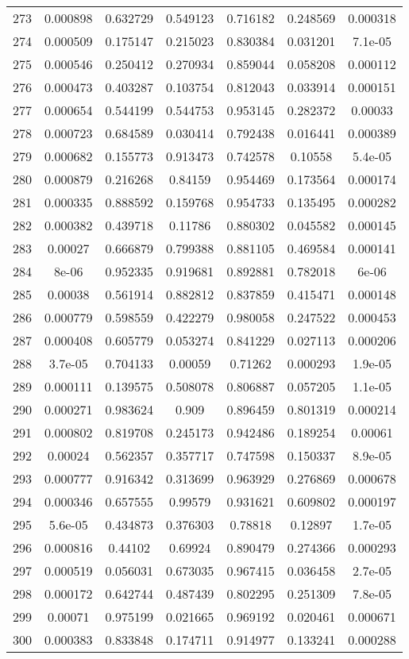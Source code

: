 \begin{table}
\begin{tabular}{c|c|c|c|c|c|c}
273 & 0.000898 & 0.632729 & 0.549123 & 0.716182 & 0.248569 & 0.000318\\
274 & 0.000509 & 0.175147 & 0.215023 & 0.830384 & 0.031201 & 7.1e-05\\
275 & 0.000546 & 0.250412 & 0.270934 & 0.859044 & 0.058208 & 0.000112\\
276 & 0.000473 & 0.403287 & 0.103754 & 0.812043 & 0.033914 & 0.000151\\
277 & 0.000654 & 0.544199 & 0.544753 & 0.953145 & 0.282372 & 0.00033\\
278 & 0.000723 & 0.684589 & 0.030414 & 0.792438 & 0.016441 & 0.000389\\
279 & 0.000682 & 0.155773 & 0.913473 & 0.742578 & 0.10558 & 5.4e-05\\
280 & 0.000879 & 0.216268 & 0.84159 & 0.954469 & 0.173564 & 0.000174\\
281 & 0.000335 & 0.888592 & 0.159768 & 0.954733 & 0.135495 & 0.000282\\
282 & 0.000382 & 0.439718 & 0.11786 & 0.880302 & 0.045582 & 0.000145\\
283 & 0.00027 & 0.666879 & 0.799388 & 0.881105 & 0.469584 & 0.000141\\
284 & 8e-06 & 0.952335 & 0.919681 & 0.892881 & 0.782018 & 6e-06\\
285 & 0.00038 & 0.561914 & 0.882812 & 0.837859 & 0.415471 & 0.000148\\
286 & 0.000779 & 0.598559 & 0.422279 & 0.980058 & 0.247522 & 0.000453\\
287 & 0.000408 & 0.605779 & 0.053274 & 0.841229 & 0.027113 & 0.000206\\
288 & 3.7e-05 & 0.704133 & 0.00059 & 0.71262 & 0.000293 & 1.9e-05\\
289 & 0.000111 & 0.139575 & 0.508078 & 0.806887 & 0.057205 & 1.1e-05\\
290 & 0.000271 & 0.983624 & 0.909 & 0.896459 & 0.801319 & 0.000214\\
291 & 0.000802 & 0.819708 & 0.245173 & 0.942486 & 0.189254 & 0.00061\\
292 & 0.00024 & 0.562357 & 0.357717 & 0.747598 & 0.150337 & 8.9e-05\\
293 & 0.000777 & 0.916342 & 0.313699 & 0.963929 & 0.276869 & 0.000678\\
294 & 0.000346 & 0.657555 & 0.99579 & 0.931621 & 0.609802 & 0.000197\\
295 & 5.6e-05 & 0.434873 & 0.376303 & 0.78818 & 0.12897 & 1.7e-05\\
296 & 0.000816 & 0.44102 & 0.69924 & 0.890479 & 0.274366 & 0.000293\\
297 & 0.000519 & 0.056031 & 0.673035 & 0.967415 & 0.036458 & 2.7e-05\\
298 & 0.000172 & 0.642744 & 0.487439 & 0.802295 & 0.251309 & 7.8e-05\\
299 & 0.00071 & 0.975199 & 0.021665 & 0.969192 & 0.020461 & 0.000671\\
300 & 0.000383 & 0.833848 & 0.174711 & 0.914977 & 0.133241 & 0.000288\\
\end{tabular}
\end{table}
